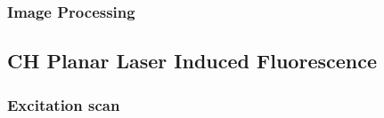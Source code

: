 \subsubsection{Image Processing}

\subsection{CH Planar Laser Induced Fluorescence}

\subsubsection{Excitation scan}
